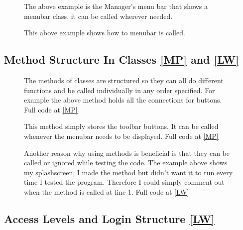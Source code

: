 \begin{figure}[H]
    \caption{The above example is the Manager's menu bar that shows a menubar class, it can be called wherever needed.} \label{fig:Dialog Class}
\end{figure}

\begin{figure}[H]
    \caption{This above example shows how to menubar is called.} \label{fig:Dialog Class}
\end{figure}

\subsection{Method Structure In Classes \ref{MP} and \ref{LW}}
 
 \begin{figure}[H]
	\begin{scriptsize}
	 \end{scriptsize}
    \caption{The methods of classes are structured so they can all do different functions and be called individually in any order specified. For example the above method holds all the connections for buttons. Full code at \ref{MP}} \label{fig:Dialog Class}
\end{figure}

 \begin{figure}[H]
    \caption{This method simply stores the toolbar buttons. It can be called whenever the menubar needs to be displayed. Full code at \ref{MP}} \label{fig:Dialog Class}
\end{figure}

 \begin{figure}[H]
    \caption{Another reason why using methods is beneficial is that they can be called or ignored while testing the code. The example above shows my splashscreen, I made the method but didn't want it to run every time I tested the program. Therefore I could simply comment out when the method is called at line 1. Full code at \ref{LW}} \label{fig:Dialog Class}
\end{figure}

\subsection{Access Levels and Login Structure \ref{LW}}

